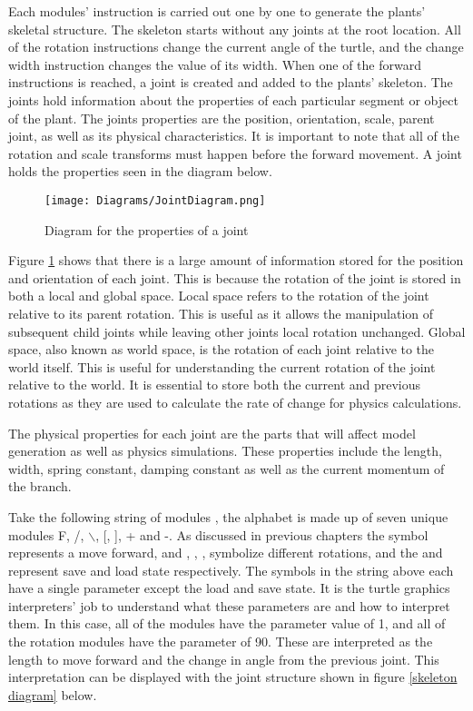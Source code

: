 \noindent
Each modules' instruction is carried out one by one to generate the plants' skeletal structure. The skeleton starts without any joints at the root location. All of the rotation instructions change the current angle of the turtle, and the change width instruction changes the value of its width. When one of the forward instructions is reached, a joint is created and added to the plants' skeleton. The joints hold information about the properties of each particular segment or object of the plant. The joints properties are the position, orientation, scale, parent joint, as well as its physical characteristics. It is important to note that all of the rotation and scale transforms must happen before the forward movement. A joint holds the properties seen in the diagram below.

\begin{figure}[htbp]
	{\centering
		\vspace{7px}
		\texttt{[image: Diagrams/JointDiagram.png]}
		\caption{Diagram for the properties of a joint} \label{joint properties}
	}
\end{figure}
\FloatBarrier

\noindent
Figure \ref{joint properties} shows that there is a large amount of information stored for the position and orientation of each joint. This is because the rotation of the joint is stored in both a local and global space. Local space refers to the rotation of the joint relative to its parent rotation. This is useful as it allows the manipulation of subsequent child joints while leaving other joints local rotation unchanged. Global space, also known as world space, is the rotation of each joint relative to the world itself. This is useful for understanding the current rotation of the joint relative to the world. It is essential to store both the current and previous rotations as they are used to calculate the rate of change for physics calculations.

The physical properties for each joint are the parts that will affect model generation as well as physics simulations. These properties include the length, width, spring constant, damping constant as well as the current momentum of the branch. 

Take the following string of modules , the alphabet is made up of seven unique modules F, /, $\backslash$, [, ], + and -. As discussed in previous chapters the  symbol represents a move forward, and \say{+}, \say{-}, \say{/}, \say{$\backslash$} symbolize different rotations, and the \say{[} and \say{]} represent save and load state respectively. The symbols in the string above each have a single parameter except the load and save state. It is the turtle graphics interpreters' job to understand what these parameters are and how to interpret them. In this case, all of the  modules have the parameter value of 1, and all of the rotation modules have the parameter of 90. These are interpreted as the length to move forward and the change in angle from the previous joint. This interpretation can be displayed with the joint structure shown in figure \ref{skeleton diagram} below.

